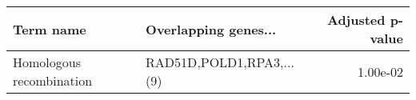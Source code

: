 \begin{tabular}{llr}
\toprule
               Term name &     Overlapping genes... &  Adjusted p-value \\
\midrule
Homologous recombination & RAD51D,POLD1,RPA3,...(9) &          1.00e-02 \\
\bottomrule
\end{tabular}
